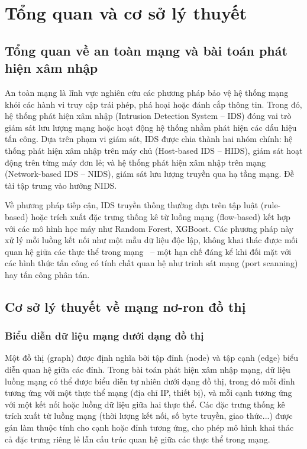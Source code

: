\chapter{Tổng quan và cơ sở lý thuyết}

\section{Tổng quan về an toàn mạng và bài toán phát hiện xâm nhập}

An toàn mạng là lĩnh vực nghiên cứu các phương pháp bảo vệ hệ thống mạng khỏi các hành vi truy cập trái phép, phá hoại hoặc đánh cắp thông tin. Trong đó, hệ thống phát hiện xâm nhập (Intrusion Detection System -- IDS) đóng vai trò giám sát lưu lượng mạng hoặc hoạt động hệ thống nhằm phát hiện các dấu hiệu tấn công. Dựa trên phạm vi giám sát, IDS được chia thành hai nhóm chính: hệ thống phát hiện xâm nhập trên máy chủ (Host-based IDS -- HIDS), giám sát hoạt động trên từng máy đơn lẻ; và hệ thống phát hiện xâm nhập trên mạng (Network-based IDS -- NIDS), giám sát lưu lượng truyền qua hạ tầng mạng. Đề tài tập trung vào hướng NIDS.

Về phương pháp tiếp cận, IDS truyền thống thường dựa trên tập luật (rule-based) hoặc trích xuất đặc trưng thống kê từ luồng mạng (flow-based) kết hợp với các mô hình học máy như Random Forest, XGBoost. Các phương pháp này xử lý mỗi luồng kết nối như một mẫu dữ liệu độc lập, không khai thác được mối quan hệ giữa các thực thể trong mạng~\cite{bilot2023gnnids} -- một hạn chế đáng kể khi đối mặt với các hình thức tấn công có tính chất quan hệ như trinh sát mạng (port scanning) hay tấn công phân tán.

\section{Cơ sở lý thuyết về mạng nơ-ron đồ thị}

\subsection{Biểu diễn dữ liệu mạng dưới dạng đồ thị}

Một đồ thị (graph) được định nghĩa bởi tập đỉnh (node) và tập cạnh (edge) biểu diễn quan hệ giữa các đỉnh. Trong bài toán phát hiện xâm nhập mạng, dữ liệu luồng mạng có thể được biểu diễn tự nhiên dưới dạng đồ thị, trong đó mỗi đỉnh tương ứng với một thực thể mạng (địa chỉ IP, thiết bị), và mỗi cạnh tương ứng với một kết nối hoặc luồng dữ liệu giữa hai thực thể. Các đặc trưng thống kê trích xuất từ luồng mạng (thời lượng kết nối, số byte truyền, giao thức...) được gán làm thuộc tính cho cạnh hoặc đỉnh tương ứng, cho phép mô hình khai thác cả đặc trưng riêng lẻ lẫn cấu trúc quan hệ giữa các thực thể trong mạng.

